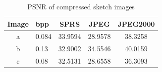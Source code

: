 

\begin{table}[H]
\centering
\begin{tabular}{| c l | c | c | c|}
\hline\hline
Image & bpp & SPRS & JPEG & JPEG2000 \\
\hline
a & 0.084 & 33.9594 & 28.9578 & 38.3258  \\
\hline
b & 0.13 & 32.9002 & 34.5546 &  40.0159 \\
\hline
c & 0.08 & 32.5131 & 28.6558 & 36.3093  \\
\hline
\end{tabular}
\caption{PSNR of compressed sketch images}
\label{tab:compression2}
\end{table}
